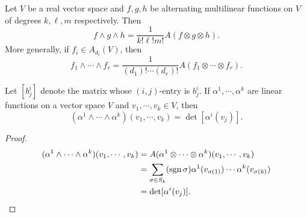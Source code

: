 \begin{cor}
    Let $V$ be a real vector space and $f,g,h$ be alternating multilinear functions on $V$ of degrees $k,\ell,m$ respectively. Then \[
        f\wedge g\wedge h = \frac{1}{k!\ell!m!}A(f\otimes g \otimes h).
    \] More generally, if $f_i \in A_{d_i }(V)$, then \[
    f_1\wedge \cdots \wedge f_r = \frac{1}{(d_1)!\cdots (d_r)!}A(f_1\otimes \cdots \otimes f_r).
\] 
\end{cor}
\begin{prop}
Let $[b^i _j ]$ denote the matrix whose $(i,j)$-entry is $b^i _j $. If $\alpha ^1,\cdots ,\alpha ^k$ are linear functions on a vector space $V$ and $v_1,\cdots ,v_k\in V$, then \[
        (\alpha ^1\wedge \cdots \wedge \alpha ^k)(v_1,\cdots ,v_k)=\det [\alpha ^i (v_j )].
    \] 
\end{prop}
\begin{proof}
    \begin{align*}
        (\alpha ^1\wedge \cdots \wedge \alpha ^k)(v_1,\cdots ,v_k)&= A(\alpha ^1 \otimes \cdots \otimes \alpha ^k)(v_1,\cdots ,v_k)\\
                                                                  &=\sum _{\sigma \in S_k}(\operatorname{sgn}\sigma)\alpha ^1(v_{\sigma(1)})\cdots \alpha ^k(v_{\sigma(k)})\\
                                                                  &=\det [\alpha ^i (v_j )].\qedhere
    \end{align*}
\end{proof}
